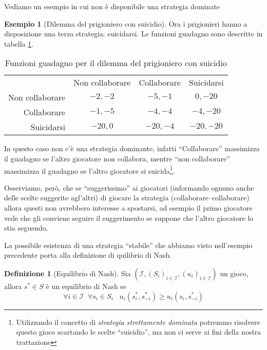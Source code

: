 \documentclass[a4paper]{article}
\newcounter{counter1}
\theoremstyle{plain}
\theoremstyle{definition}
\newtheorem{mydef}[counter1]{Definizione}
\newtheorem{myes}[counter1]{Esempio}
\theoremstyle{remark}
\newcommand{\pa}[1]{\left(#1\right)}
\begin{document}
Vediamo un esempio in cui non è disponibile una strategia dominate

\begin{myes}[Dilemma del prigioniero con suicidio]
  Ora i prigionieri hanno a disposizione una terza strategia:
  suicidarsi. Le funzioni guadagno sono descritte in tabella
  \ref{tab:u1u2-prigioniero-suicidio}.
  \begin{table}[!ht]
    \centering
    \begin{tabular}{rccc}
      & Non collaborare & Collaborare & Suicidarsi \\
      \cline{2-4}
      Non collaborare & \multicolumn{1}{|c|}{$-2,-2$} & \multicolumn{1}{|c|}{$-5,-1$} & \multicolumn{1}{|c|}{$0,-20$}  \\
      \cline{2-4}
      Collaborare & \multicolumn{1}{|c|}{$-1,-5$} & \multicolumn{1}{|c|}{$-4,-4$}  & \multicolumn{1}{|c|}{$-4,-20$} \\
      \cline{2-4}
      Suicidarsi & \multicolumn{1}{|c|}{$-20,0$} & \multicolumn{1}{|c|}{$-20,-4$}  & \multicolumn{1}{|c|}{$-20,-20$} \\
      \cline{2-4}
    \end{tabular}
    \caption{Funzioni guadagno per il dilemma del prigioniero con
      suicidio}
    \label{tab:u1u2-prigioniero-suicidio}
  \end{table}

  In questo caso non c'è una strategia dominante, infatti
  ``Collaborare'' massimizza il guadagno se l'altro giocatore non
  collabora, mentre ``non collaborare'' massimizza il guadagno se
  l'altro giocatore si suicida\footnote{Utilizzando il concetto di
    \textit{strategia strettamente dominata} potremmo risolvere questo
    gioco scartando le scelte ``suicidio'', ma non ci serve ai fini
    della nostra trattazione}.

  Osserviamo, però, che se ``suggerissimo'' ai giocatori (informando
  ognuno anche delle scelte suggerite agl'altri) di giocare la
  strategia (collaborare--collaborare) allora questi non avrebbero
  interesse a spostarsi, ad esempio il primo giocatore vede che gli
  conviene seguire il suggerimento se suppone che l'altro giocatore lo
  stia seguendo.
\end{myes}

La possibile esistenza di una strategia ``stabile'' che abbiamo visto
nell'esempio precedente porta alla definizione di quilibrio di Nash.

\begin{mydef}[Equilibrio di Nash]
  Sia  $\pa{\mathcal{I},\pa{S_i}_{i\in\mathcal{I}},
    \pa{u_i}_{i\in\mathcal{I}}}$ un gioco, allora  
  $s^* \in S$ è un equilibrio di Nash se
  \[ \forall i\in \mathcal{I}\;\; \forall s_i \in S_i \;\;\;
    u_i\pa{s^*_i,s^*_{-i}} \ge u_i\pa{s_i,s^*_{-i}} \]
\end{mydef}
\end{document}
